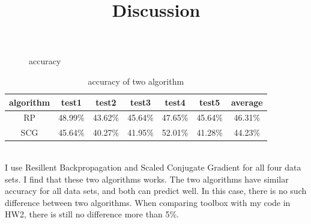 \documentclass[12pt,a4paper]{article}
\begin{document}
\begin{CJK}{UTF8}{bsmi}
\begin{enumerate}
\begin{enumerate}
\begin{figure}[H]
\begin{subfigure}{.5\textwidth}
	 		\end{subfigure}
	 		\caption{accuracy}
	 		
	 	\end{figure}
	 	
	 	\begin{table}[H]
	 		\caption{accuracy of two algorithm} %
	 		\centering %
	 		\begin{tabular}{c c c c c c c} %
	 			\hline\hline %
	 			algorithm & test1 & test2 & test3 & test4 &test5 & average\\ [0.5ex] %
	 			\hline %
	 			RP & 48.99\% & 43.62\% & 45.64\% & 47.65\% &45.64\% &46.31\%\\ %
	 			
	 			SCG & 45.64\% & 40.27\% & 41.95\% & 52.01\% &41.28\% &44.23\%\\
	 			[0.5ex] %
	 			\hline %
	 		\end{tabular}
	 	\end{table}

	 \end{enumerate}
	 \vspace{1cm}
	 \title{\large \bf Discussion}
	 \\
	 \setlength{\parindent}{5ex}
	 \indent
	  I use Resillent Backpropagation and Scaled Conjugate Gradient for all four data sets. I find that these two algorithms works. The two algorithms have similar accuracy for all data sets, and both can predict well. In this case, there is no such difference between two algorithms. When comparing toolbox with my code in HW2, there is still no difference more than 5\%.
	
	\end{enumerate}
	
\end{CJK}
\end{document}
